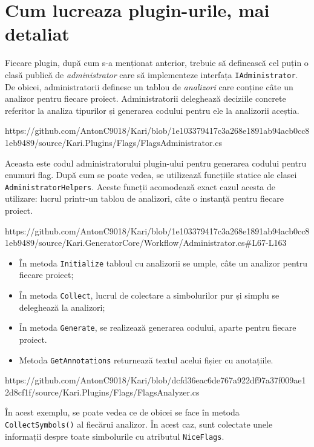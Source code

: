 \documentclass{report}
\begin{document}
\section{Cum lucreaza plugin-urile, mai detaliat}

Fiecare plugin, după cum s-a menționat anterior, trebuie să definească cel puțin o clasă publică de \emph{administrator} care să implementeze interfața \texttt{IAdministrator}.
De obicei, administratorii definesc un tablou de \emph{analizori} care conține câte un analizor pentru fiecare proiect.
Administratorii deleghează deciziile concrete referitor la analiza tipurilor și generarea codului pentru ele la analizorii aceștia.

https://github.com/AntonC9018/Kari/blob/1e103379417c3a268e1891ab94acb0cc81eb9489/source/Kari.Plugins/Flags/FlagsAdministrator.cs

Aceasta este codul administratorului plugin-ului pentru generarea codului pentru enumuri flag.
După cum se poate vedea, se utilizează funcțiile statice ale clasei \texttt{AdministratorHelpers}.
Aceste funcții acomodează exact cazul acesta de utilizare: lucrul printr-un tablou de analizori, câte o instanță pentru fiecare proiect.

https://github.com/AntonC9018/Kari/blob/1e103379417c3a268e1891ab94acb0cc81eb9489/source/Kari.GeneratorCore/Workflow/Administrator.cs#L67-L163 

\begin{itemize}
  \item În metoda \texttt{Initialize\(\)} tabloul cu analizorii se umple, câte un analizor pentru fiecare proiect;
  \item În metoda \texttt{Collect\(\)}, lucrul de colectare a simbolurilor pur și simplu se deleghează la analizori;
  \item În metoda \texttt{Generate\(\)}, se realizează generarea codului, aparte pentru fiecare proiect.
  \item Metoda \texttt{GetAnnotations\(\)} returnează textul acelui fișier cu anotațiile.
\end{itemize}

https://github.com/AntonC9018/Kari/blob/dcfd36eac6de767a922df97a37f009ae12d8cf1f/source/Kari.Plugins/Flags/FlagsAnalyzer.cs

În acest exemplu, se poate vedea ce de obicei se face în metoda \texttt{CollectSymbols()} al fiecărui analizor.
În acest caz, sunt colectate unele informații despre toate simbolurile cu atributul \texttt{NiceFlags}.
\end{document}
